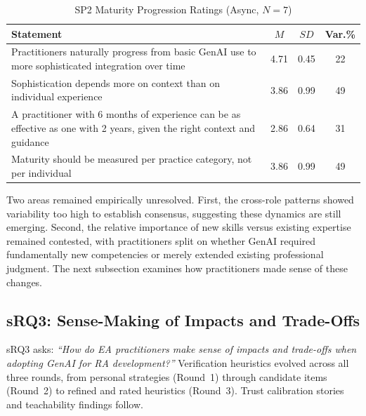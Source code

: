 \begin{table}[!ht]
    \centering
    \caption{SP2 Maturity Progression Ratings (Async, $N = 7$)}\label{tab:maturity-progression}
    \begin{tabular}{|p{7.5cm}|c|c|c|}
        \hline
        \textbf{Statement} & \textbf{$M$} & \textbf{$SD$} & \textbf{Var.\%} \\
        \hline
        Practitioners naturally progress from basic GenAI use to more sophisticated integration over time & 4.71 & 0.45 & 22 \\
        \hline
        Sophistication depends more on context than on individual experience & 3.86 & 0.99 & 49 \\
        \hline
        A practitioner with 6 months of experience can be as effective as one with 2 years, given the right context and guidance & 2.86 & 0.64 & 31 \\
        \hline
        Maturity should be measured per practice category, not per individual & 3.86 & 0.99 & 49 \\
        \hline
    \end{tabular}
\end{table}

Two areas remained empirically unresolved. First, the cross-role patterns showed
variability too high to establish consensus, suggesting these dynamics are still
emerging. Second, the relative importance of new skills versus existing expertise
remained contested, with practitioners split on whether GenAI required
fundamentally new competencies or merely extended existing professional judgment.
The next subsection examines how practitioners made sense of these changes.

\subsection{sRQ3: Sense-Making of Impacts and Trade-Offs}\label{subsec:srq3}

sRQ3 asks: \textit{``How do EA practitioners make sense of impacts and
trade-offs when adopting GenAI for RA development?''} Verification heuristics
evolved across all three rounds, from personal strategies (Round~1) through
candidate items (Round~2) to refined and rated heuristics (Round~3). Trust
calibration stories and teachability findings follow.

